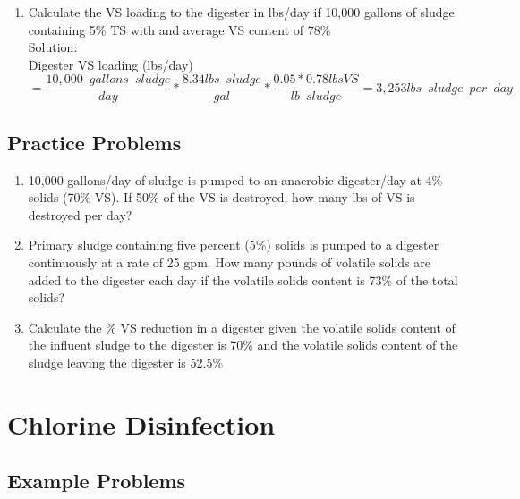 \begin{enumerate}
\item Calculate the VS loading to the digester in lbs/day if 10,000 gallons of sludge containing 5\% TS with and average VS content of 78\%\\
Solution:\\
Digester VS loading (lbs/day)\\$=\dfrac{10,000 \enspace gallons \enspace sludge}{day}*\dfrac{8.34lbs \enspace sludge}{gal}*\dfrac{0.05*0.78lbs VS}{lb \enspace sludge}=\boxed{3,253lbs \enspace sludge \enspace per \enspace day}$




\end{enumerate}

\subsection{Practice Problems} 

\begin{enumerate}

\item 10,000 gallons/day of sludge is pumped to an anaerobic digester/day at 4\% solids (70\% VS).  If 50\% of the VS is destroyed, how many lbs of VS is destroyed per day?\\

\item Primary sludge containing five percent (5\%) solids is pumped to a digester continuously at a rate of 25 gpm. How many pounds of volatile solids are added to the digester each day if the volatile solids content is 73\% of the total solids?\\

\item Calculate the \% VS reduction in a digester given the volatile solids content of the influent sludge to the digester is 70\% and the volatile solids content of the sludge leaving the digester is 52.5\%\\

\end{enumerate}

\newpage
\section{Chlorine Disinfection}

\subsection{Example Problems} 

